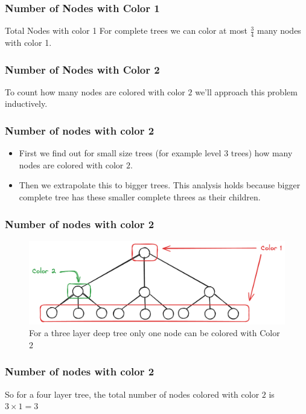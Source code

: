\begin{frame}
    \frametitle{Number of Nodes with Color 1}

    \begin{Fact}{Total Nodes with color 1}{}
        For complete trees we can color at most $\frac{3}{4}$ many nodes with color 1.
    \end{Fact}

\end{frame}

\begin{frame}
    \frametitle{Number of Nodes with Color 2}

    To count how many nodes are colored with color $2$ we'll approach this problem inductively.    

\end{frame}

\begin{frame}
    \frametitle{Number of nodes with color 2}


    \begin{itemize}
        \item First we find out for small size trees (for example level $3$ trees) how many nodes are colored with color $2$.\pause[]
        \item Then we extrapolate this to bigger trees. This analysis holds because bigger complete tree has these smaller complete threes as their children.
    \end{itemize}

\end{frame}

\begin{frame}
    \frametitle{Number of nodes with color 2}

    \begin{figure}
        \centering
        \includegraphics[width=0.7\linewidth]{images/layer 3.png}
        \caption{For a three layer deep tree only one node can be colored with Color $2$}
        \label{fig:enter-label}
    \end{figure}

\end{frame}

\begin{frame}
    \frametitle{Number of nodes with color 2}

    So for a four layer tree, the total number of nodes colored with color $2$ is $3 \times 1 = 3$

\end{frame}


